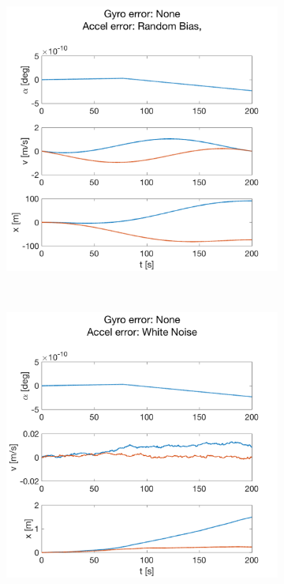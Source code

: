 \documentclass{article}
\begin{document}
\begin{figure}[H]
    \centering
    \begin{subfigure}[t]{0.49\textwidth}
        \centering
        \includegraphics[width=\textwidth]{fig/accel_bc}
        \caption{}
    \end{subfigure}
    ~
    \begin{subfigure}[t]{0.49\textwidth}
        \centering
        \includegraphics[width=\textwidth]{fig/accel_wn}

\end{subfigure}
\end{figure}
\end{document}
